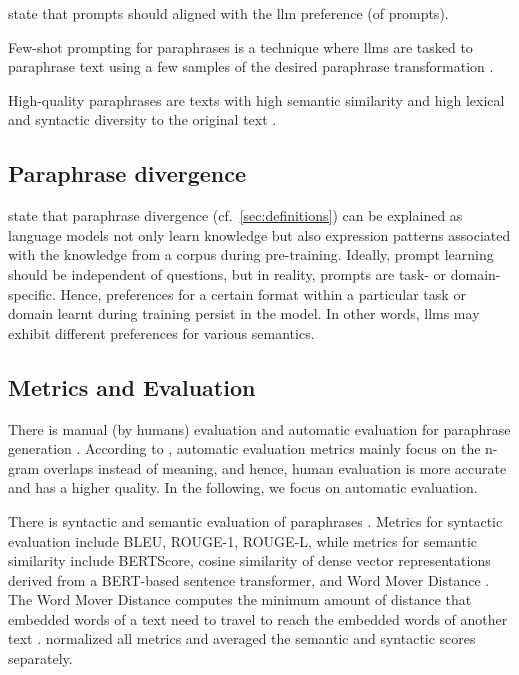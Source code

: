 \citet{zhou_paraphrase_2025} state that prompts should aligned with the \ac{llm} preference (of prompts).

Few-shot prompting for paraphrases is a technique where \acp{llm} are tasked to paraphrase text using a few samples of the desired paraphrase transformation \citep{zhou_paraphrase_2025}.

High-quality paraphrases are texts with high semantic similarity and high lexical and syntactic diversity to the original text \citep{gohsen_captions_2023}.


\subsection{Paraphrase divergence}
\citet{fu_learning_2024} state that paraphrase divergence (cf.~\autoref{sec:definitions}) can be explained as language models 
not only learn knowledge but also expression patterns associated with the knowledge from a corpus during pre-training.
Ideally, prompt learning should be independent of questions, but in reality, prompts are task- or domain-specific.
Hence, preferences for a certain format within a particular task or domain learnt during training persist in the model.
In other words, \acp{llm} may exhibit different preferences for various semantics.


\subsection{Metrics and Evaluation}
There is manual (by humans) evaluation and automatic evaluation for paraphrase generation \citep{fu_learning_2024,zhou_paraphrase_2021}.
According to \citet{zhou_paraphrase_2021}, automatic evaluation metrics mainly focus on the n-gram overlaps instead of meaning, 
and hence, human evaluation is more accurate and has a higher quality.
In the following, we focus on automatic evaluation.

There is syntactic and semantic evaluation of paraphrases \citep{gohsen_captions_2023}.
Metrics for syntactic evaluation include BLEU, ROUGE-1, ROUGE-L, 
while metrics for semantic similarity include BERTScore, 
cosine similarity of dense vector representations derived from a BERT-based sentence transformer, 
and Word Mover Distance \citep{gohsen_captions_2023}.
The Word Mover Distance computes the minimum amount of distance that embedded words of a text need to travel 
to reach the embedded words of another text \citep{gohsen_captions_2023}.
\citet{gohsen_captions_2023} normalized all metrics and averaged the semantic and syntactic scores separately.

